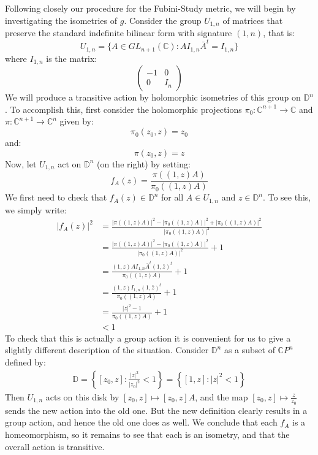 \documentclass[11pt]{amsart}
\theoremstyle{definition}
\def \CP{ \mathbb{C}P }
\def \C{ \mathbb{C} }
\def \disk{ \mathbb{D} }
\begin{document}
Following closely our procedure for the Fubini-Study metric, we will begin by investigating the isometries of $g$.  Consider the group $U_{1,n}$ of matrices that preserve the standard indefinite bilinear form with signature $(1,n)$, that is:
%
$$ U_{1,n} = \{ A \in GL_{n+1}( \C ) : A I_{1,n} \bar{A}^{t} = I_{1,n} \} $$
%
where $I_{1,n}$ is the matrix:
%
$$ \left( \begin{array}{cc} -1 & 0 \\ 0 & I_n \end{array} \right) $$
%
We will produce a transitive action by holomorphic isometries of this group on $\disk^n$.  To accomplish this, first consider the holomorphic projections $\pi_0 : \C^{n+1} \rightarrow \C $ and $ \pi : \C^{n+1} \rightarrow \C^{n} $ given by:
%
$$ \pi_0 ( z_0, z ) = z_0 $$
%
and:
%
$$ \pi ( z_0, z ) = z $$
%
Now, let $U_{1,n}$ act on $\disk^n$ (on the right) by setting:
%
$$ f_A (z) = \frac{ \pi( (1,z)A ) }{ \pi_0 ( (1,z)A ) } $$
%
We first need to check that $f_A (z) \in \disk^n$ for all $A \in U_{1,n}$ and $z \in \disk^n$.  To see this, we simply write:
%
\begin{align*}
|f_A (z)|^2 &= \frac{ |\pi( (1,z)A )|^2 - |\pi_0 ( (1,z)A )|^2 + |\pi_0 ( (1,z)A )|^2 }{ |\pi_0 ( (1,z)A )|^2 } \\
&= \frac{ |\pi( (1,z)A )|^2 - |\pi_0 ( (1,z)A )|^2 }{ |\pi_0 ( (1,z)A )|^2 } + 1 \\
&= \frac{ (1,z)A I_{1,n} \bar{A}^{t} (1, \bar{z})^{t} }{ \pi_0 ( (1,z)A ) } + 1 \\
&= \frac{ (1,z) I_{1,n} (1, \bar{z} )^{t} }{ \pi_0 ( (1,z)A ) } + 1\\
&= \frac{ |z|^2 - 1  }{ \pi_0 ( (1,z)A ) } + 1 \\
&< 1
\end{align*}
%
To check that this is actually a group action it is convenient for us to give a slightly different description of the situation.  Consider $\disk^n$ as a subset of $\CP^n$ defined by:
%
\begin{align*} \disk = \left\{ [z_0, z] : \frac{ |z|^2 }{ |z_0|^2 } < 1 \right\} = \left\{ [1,z] : |z|^2 < 1 \right\}
\end{align*}
%
Then $U_{1,n}$ acts on this disk by $[z_0, z] \mapsto [z_0, z]A$, and the map $[z_0, z] \mapsto \frac{z}{z_0}$ sends the new action into the old one.  But the new definition clearly results in a group action, and hence the old one does as well.  We conclude that each $f_A$ is a homeomorphism, so it remains to see that each is an isometry, and that the overall action is transitive.
\end{document}
